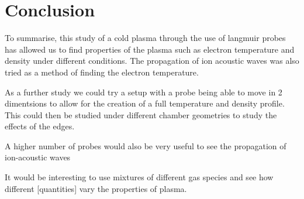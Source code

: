 \section{Conclusion}
To summarise, this study of a cold plasma through the use of langmuir probes has allowed us to find properties of the plasma such as electron temperature and density under different conditions. The propagation of ion acoustic waves was also tried as a method of finding the electron temperature.

As a further study we could try a setup with  a probe being able to move in 2 dimentsions to allow for the creation of a full temperature and density profile. This could then be studied under different chamber geometries to study the effects of the edges.

A higher number of probes would also be very useful to see the propagation of ion-acoustic waves

It would be interesting to use mixtures of different gas species and see how different [quantities] vary the properties of plasma.